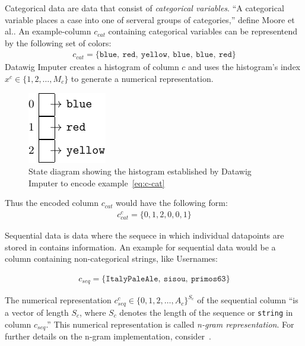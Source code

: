 Categorical data are data that consist of \emph{categorical variables}.
``A categorical variable places a case into one of serveral groups of categories,'' define Moore et al.\~\cite[p.~4]{MOO11}.
An example-column \( c_{cat} \) containing categorical variables can be representend by the following set of colors:
\begin{align}\label{eq:c-cat}
    c_{cat} = \{ \texttt{blue},~\texttt{red},~\texttt{yellow},~\texttt{blue},~\texttt{blue},~\texttt{red} \}
\end{align}
Datawig Imputer creates a histogram of column \( c \) and uses the histogram's index \( x^c \in \{1, 2, \dots, M_c \} \) to generate a numerical representation.
\begin{figure}[h]
    \centering
    \includegraphics[width=.3\textwidth]{images/state_diagrams/color_histogram}
    \caption{State diagram showing the histogram established by Datawig Imputer to encode example~\ref{eq:c-cat}}
    \label{fig:state-diagram-color}
\end{figure}
Thus the encoded column \( c_{cat} \) would have the following form:
\begin{align}
    c_{cat}^{c} = \{ 0, 1, 2, 0, 0, 1\}
\end{align}

Sequential data is data where the sequece in which individual datapoints are stored in contains information.
An example for sequential data would be a column containing non-categorical strings, like Usernames:

\begin{align}
    c_{seq} = \{ \texttt{ItalyPaleAle},~\texttt{sisou},~\texttt{primos63} \}
\end{align}

The numerical representation \( c_{seq}^{c} \in \{ 0, 1, 2, \dots, A_c \}^{S_c} \) of the sequential column ``is a vector of length \( S_c \), where \( S_c \) denotes the length of the sequence or \texttt{string} in column \( c_{seq} \).''\cite[p.2020]{BIE18}
This numerical representation is called \emph{n-gram representation}.
For further details on the n-gram implementation, consider~\cite[p.2020]{BIE18}.


